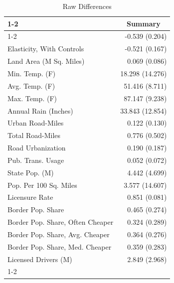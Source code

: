 \begin{table}[!h]
\caption{Raw Differences}
\centering
\begin{tabular}{ll}
\cline{1-2}
\multicolumn{1}{r}{} &
  \multicolumn{1}{c}{Summary} \\
\cline{1-2}
\multicolumn{1}{l}{Elasticity, Without Controls} &
  \multicolumn{1}{r}{-0.539 (0.204)} \\
\multicolumn{1}{l}{Elasticity, With Controls} &
  \multicolumn{1}{r}{-0.521 (0.167)} \\
\multicolumn{1}{l}{Land Area (M Sq. Miles)} &
  \multicolumn{1}{r}{0.069 (0.086)} \\
\multicolumn{1}{l}{Min. Temp. (F)} &
  \multicolumn{1}{r}{18.298 (14.276)} \\
\multicolumn{1}{l}{Avg. Temp. (F)} &
  \multicolumn{1}{r}{51.416 (8.711)} \\
\multicolumn{1}{l}{Max. Temp. (F)} &
  \multicolumn{1}{r}{87.147 (9.238)} \\
\multicolumn{1}{l}{Annual Rain (Inches)} &
  \multicolumn{1}{r}{33.843 (12.854)} \\
\multicolumn{1}{l}{Urban Road-Miles} &
  \multicolumn{1}{r}{0.122 (0.130)} \\
\multicolumn{1}{l}{Total Road-Miles} &
  \multicolumn{1}{r}{0.776 (0.502)} \\
\multicolumn{1}{l}{Road Urbanization} &
  \multicolumn{1}{r}{0.190 (0.187)} \\
\multicolumn{1}{l}{Pub. Trans. Usage} &
  \multicolumn{1}{r}{0.052 (0.072)} \\
\multicolumn{1}{l}{State Pop. (M)} &
  \multicolumn{1}{r}{4.442 (4.699)} \\
\multicolumn{1}{l}{Pop. Per 100 Sq. Miles} &
  \multicolumn{1}{r}{3.577 (14.607)} \\
\multicolumn{1}{l}{Licensure Rate} &
  \multicolumn{1}{r}{0.851 (0.081)} \\
\multicolumn{1}{l}{Border Pop. Share} &
  \multicolumn{1}{r}{0.465 (0.274)} \\
\multicolumn{1}{l}{Border Pop. Share, Often Cheaper} &
  \multicolumn{1}{r}{0.324 (0.289)} \\
\multicolumn{1}{l}{Border Pop. Share, Avg. Cheaper} &
  \multicolumn{1}{r}{0.364 (0.276)} \\
\multicolumn{1}{l}{Border Pop. Share, Med. Cheaper} &
  \multicolumn{1}{r}{0.359 (0.283)} \\
\multicolumn{1}{l}{Licensed Drivers (M)} &
  \multicolumn{1}{r}{2.849 (2.968)} \\
\cline{1-2}
\end{tabular}
\end{table}
